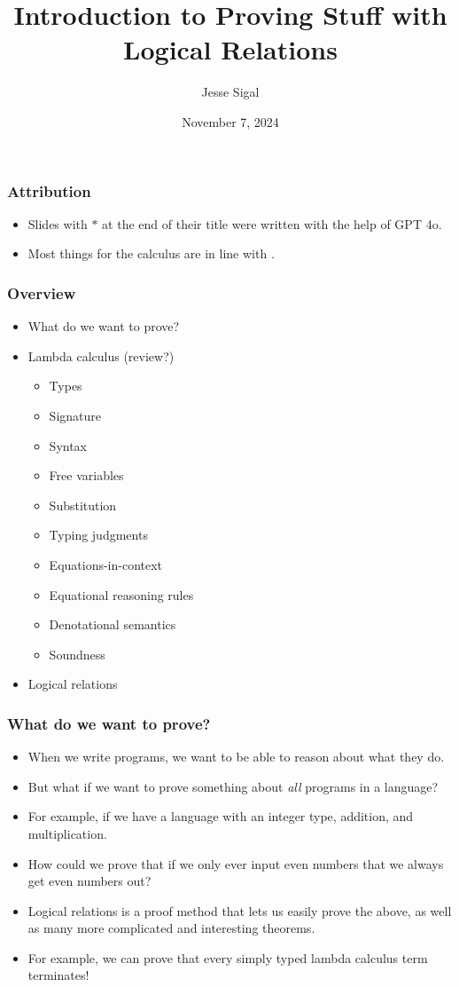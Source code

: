 \documentclass[aspectratio=169]{beamer}
\title{Introduction to Proving Stuff\textsuperscript{\texttrademark} with Logical Relations}
\author{Jesse Sigal}
\date{November 7, 2024}
\begin{document}
\begin{frame}
\titlepage
\end{frame}

\begin{frame}
\frametitle{Attribution}
\begin{itemize}
\item Slides with $*$ at the end of their title were written with the help of GPT 4o.
\item Most things for the calculus are in line with \cite{Crole_1994}.
\end{itemize}
\end{frame}

\begin{frame}
\frametitle{Overview}
\begin{itemize}
    \item What do we want to prove?
    \item Lambda calculus (review?)
    \begin{itemize}
        \item Types
        \item Signature
        \item Syntax
        \item Free variables
        \item Substitution
        \item Typing judgments
        \item Equations-in-context
        \item Equational reasoning rules
        \item Denotational semantics
        \item Soundness
    \end{itemize}
    \item Logical relations
\end{itemize}
\end{frame}

\begin{frame}
\frametitle{What do we want to prove?}

\begin{itemize}
    \item When we write programs, we want to be able to reason about what they do.
    \item But what if we want to prove something about \emph{all} programs in a language?
    \item For example, if we have a language with an integer type, addition, and multiplication.
    \item How could we prove that if we only ever input even numbers that we always get even numbers out?
    \item Logical relations is a proof method that lets us easily prove the above, as well as many more complicated and interesting theorems.
    \item For example, we can prove that every simply typed lambda calculus term terminates!
\end{itemize}
\end{frame}
\end{document}
